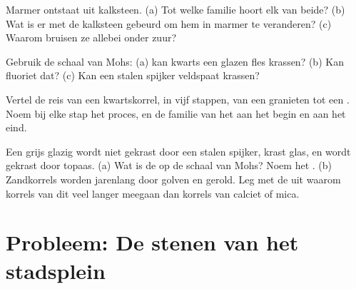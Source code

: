 \begin{exercise}[$\star\star$]\label{exo:g6:rocks-and-minerals:9}
Marmer ontstaat uit kalksteen. (a) Tot welke familie hoort elk van beide?
(b) Wat is er met de kalksteen gebeurd om hem in marmer te veranderen?
(c) Waarom bruisen ze allebei onder zuur?
\end{exercise}

\begin{exercise}[$\star\star$]\label{exo:g6:rocks-and-minerals:10}
Gebruik de schaal van Mohs: (a) kan kwarts een glazen fles krassen? (b) Kan
fluoriet dat? (c) Kan een stalen spijker veldspaat krassen?
\end{exercise}

\begin{exercise}[$\star\star\star$]\label{exo:g6:rocks-and-minerals:11}
Vertel de reis van een kwartskorrel, in vijf stappen, van een granieten
 tot een . Noem bij elke stap het proces, en de
familie van het  aan het begin en aan het eind.
\end{exercise}

\begin{exercise}[$\star\star\star$]\label{exo:g6:rocks-and-minerals:12}
Een grijs glazig  wordt niet gekrast door een stalen spijker, krast
glas, en wordt gekrast door topaas. (a) Wat is de  op de schaal
van Mohs? Noem het . (b) Zandkorrels worden jarenlang door golven en
 gerold. Leg met de  uit waarom korrels van dit 
veel langer meegaan dan korrels van calciet of mica.
\end{exercise}

\section{Probleem: De stenen van het stadsplein}

